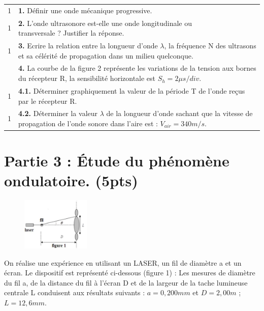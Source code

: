 \documentclass[12pt]{article}
\begin{document}
\begin{tabular}{c|l}
1 & \textbf{1. }Définir une onde mécanique progressive.\\

1 & \makecell[l]{ \textbf{2. }L’onde ultrasonore est-elle une onde longitudinale ou \\transversale ? Justifier la réponse.} \\
1& \makecell[l]{\textbf{3. }Ecrire la relation entre la longueur d’onde $\lambda$, la fréquence N des \\ultrasons et sa célérité de propagation dans un milieu quelconque.}\\
 & \makecell[l]{ \textbf{4. }La courbe de la figure 2 représente les variations de la tension aux bornes du récepteur R, la \\sensibilité horizontale est $S_h=2\mu{s}/div$.}\\
1& \textbf{4.1. }Déterminer graphiquement la valeur de la période T de l’onde reçus par le récepteur R.\\

1 & \makecell[l]{ \textbf{4.2. }Déterminer la valeur $\lambda$ de la longueur d’onde sachant que la vitesse de propagation de l’onde \\sonore dans l’aire est : $V_{air}=340m/s$.}\\
\end{tabular}
\section*{Partie 3 : Étude du phénomène ondulatoire. \dotfill(5pts) }
\begin{figure}
  \begin{center}
	  \vspace{-1.5cm}
	\includegraphics[width=0.29\textwidth]{./img/diff.png}
  \end{center}
\end{figure}


On réalise une expérience en utilisant un LASER, un fil de diamètre a et un écran. Le dispositif est
représenté ci-dessous (figure 1) :
Les mesures de diamètre du fil a, de la distance du fil à l’écran D
et de la largeur de la tache lumineuse centrale L conduisent
aux résultats suivants : $a = 0,200mm$ et $D=2,00m$ ; $L=12,6mm$.
\end{document}
